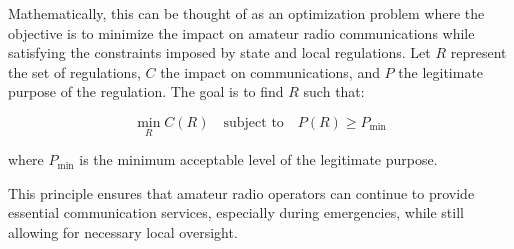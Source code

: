 Mathematically, this can be thought of as an optimization problem where the objective is to minimize the impact on amateur radio communications while satisfying the constraints imposed by state and local regulations. Let \( R \) represent the set of regulations, \( C \) the impact on communications, and \( P \) the legitimate purpose of the regulation. The goal is to find \( R \) such that:

\[
\min_{R} C(R) \quad \text{subject to} \quad P(R) \geq P_{\text{min}}
\]

where \( P_{\text{min}} \) is the minimum acceptable level of the legitimate purpose.

This principle ensures that amateur radio operators can continue to provide essential communication services, especially during emergencies, while still allowing for necessary local oversight.

